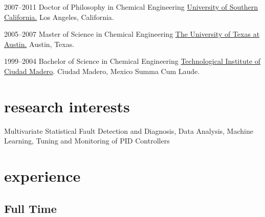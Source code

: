 \documentclass[]{../friggeri-cv} %
\begin{document}
\begin{entrylist}


\entry
{2007--2011}
{Doctor of Philosophy {\normalfont in Chemical Engineering}}
{\flushright \href{http://chems.usc.edu}{University of Southern California.} Los Angeles, California.}


\entry
{2005--2007}
{Master of Science {\normalfont in Chemical Engineering}}
{\flushright \href{http://www.che.utexas.edu/}{The University of Texas at Austin.}
Austin, Texas.}


\entry
{1999--2004}
{Bachelor of Science {\normalfont in Chemical Engineering}}
{\flushright \href{http://www.itcm.edu.mx/}{Technological Institute of Ciudad Madero}.
Ciudad Madero, Mexico}
{Summa Cum Laude.}


\end{entrylist}


\section{research interests}
Multivariate Statistical Fault Detection and Diagnosis, Data Analysis, Machine Learning, Tuning and Monitoring of PID Controllers

\section{experience}

\subsection{Full Time}
\end{document}
